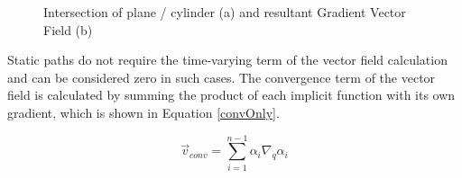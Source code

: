 \documentclass[numbered,pdftex]{ohio-etd}
\begin{document}
\begin{figure}[H]
	\begin{subfigmatrix}{2}%
		\centering	
		\hspace*{0mm}
	\end{subfigmatrix}
	\caption{Intersection of plane / cylinder (a) and resultant Gradient Vector Field (b)}
	\label{fig:gvfCircPrimitive}
\end{figure}

Static paths do not require the time-varying term of the vector field calculation and can be considered zero in such cases. The convergence term of the vector field is calculated by summing the product of each implicit function with its own gradient, which is shown in Equation \ref{convOnly}.

\begin{equation}
\vec{v}_{conv} = \sum_{i=1}^{n-1}\alpha_i\nabla_q\alpha_i  
\label{convOnly}
\end{equation}
\end{document}
